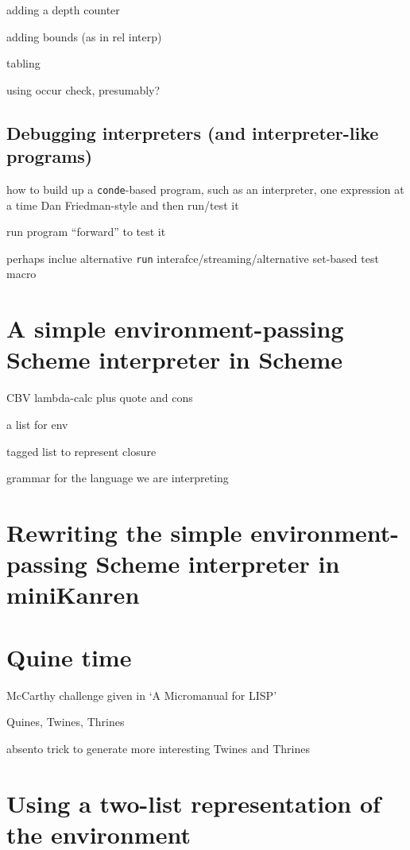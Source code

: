 \documentclass{book}
\begin{document}
adding a depth counter

adding bounds (as in rel interp)

tabling

using occur check, presumably?

\section{Debugging interpreters (and interpreter-like programs)}

how to build up a \verb|conde|-based program, such as an interpreter, one expression at a time Dan Friedman-style and then run/test it

run program ``forward'' to test it

perhaps inclue alternative \verb|run| interafce/streaming/alternative set-based test macro


\chapter{A simple environment-passing Scheme interpreter in Scheme}%

CBV lambda-calc plus quote and cons

a list for env

tagged list to represent closure

grammar for the language we are interpreting


\chapter{Rewriting the simple environment-passing Scheme interpreter in miniKanren}%


\chapter{Quine time}%

McCarthy challenge given in `A Micromanual for LISP'

Quines, Twines, Thrines

absento trick to generate more interesting Twines and Thrines


\chapter{Using a two-list representation of the environment}%
\end{document}
